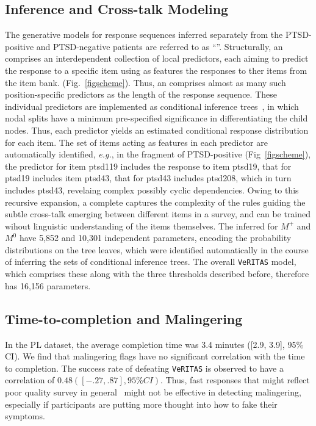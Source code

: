 \documentclass[onecolumn,10pt]{IEEEtran}
\def\vrts{\texttt{VeRITAS}\xspace}
\def\Mpos{M^+}
\def\Mcont{M^0}
\begin{document}
\subsection*{\qnet Inference and Cross-talk Modeling}
The generative models for response sequences inferred separately from the PTSD-positive and PTSD-negative patients are referred to as ``''. Structurally, an \qnet comprises an interdependent collection of  local predictors, each aiming to predict the  response to a specific item using as features  the responses to ther items from the item bank.     (Fig.~\ref{figscheme}). Thus,  an \qnet comprises almost as many such  position-specific predictors as the length of the response sequence. These individual predictors are implemented as conditional inference trees~\cite{Hothorn06unbiasedrecursive}, in which  nodal splits  have  a minimum pre-specified significance in differentiating the  child nodes. Thus, each predictor yields an estimated conditional response distribution  for each item. The set of items acting as features in each predictor are automatically identified, \textit{e.g.}, in the fragment of PTSD-positive  \qnet (Fig~\ref{figscheme}), the predictor for item ptsd119 includes the response to item ptsd19, that for ptsd19 includes item ptsd43, that for ptsd43 includes ptsd208, which in turn includes ptsd43, revelaing complex possibly cyclic dependencies. Owing to this recursive expansion,  a complete \qnet  captures the complexity of the rules guiding the subtle cross-talk emerging between different items in a survey, and can be trained wihout linguistic understanding of the items themselves. The  inferred for $\Mpos$ and $\Mcont$ have 5,852 and  10,301 independent parameters, encoding the probability distributions on the tree leaves,  which were identified automatically in the course of inferring the sets of conditional inference trees. The overall  \vrts model, which comprises these  along with the three thresholds described before, therefore has 16,156 parameters.

\subsection*{Time-to-completion and Malingering}
In the PL dataset, the average completion time was 3.4 minutes ([2.9, 3.9], 95\% CI). 
We find that malingering flags have no significant correlation with the time to completion. The success rate of defeating \vrts is observed to have a correlation of $0.48 ([-.27, .87], 95\% CI)$. Thus, fast responses  that might reflect poor quality survey in general~\cite{tourangeau2000psychology,malhotra2008completion,callegaro2009response} might not be effective in detecting malingering, especially if participants  are putting more thought into how to fake their symptoms.
\end{document}
